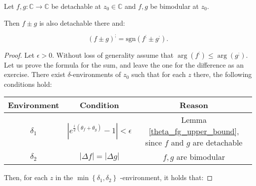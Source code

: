\documentclass[11pt]{book}
\begin{document}
\begin{theorem}Let $f,g:\mathbb{C}\longrightarrow\mathbb{C}$ be detachable at $z_{0}\in\mathbb{C}$ and $f,g$ be bimodular at $z_{0}.$

Then $f\pm g$ is also detachable there and:

$$\left(f\pm g\right)^{;}=\text{sgn}\left(f^{;}\pm g^{;}\right).$$
\label{complex_sum_rule}
\end{theorem}
\begin{proof}Let $\epsilon>0.$ Without loss of generality assume that $\arg\left(f^{;}\right)\leq\arg\left(g^{;}\right).$ Let us prove the formula for the sum, and leave the one for the difference as an exercise. There exist $\delta$-environments of $z_{0}$ such that for each $z$ there, the following conditions hold:

\begin{table}[H]
\centering
        \begin{tabular}{ccc}
        \toprule
        \textbf{Environment} & \textbf{Condition} & \textbf{Reason} \\
        \midrule
        $\delta_1$ & $\left|e^{\frac{i}{2}\left(\theta_{f}+\theta_{g}\right)}-1\right|<\epsilon$ & Lemma \ref{theta_fg_upper_bound}, since $f$ and $g$ are detachable \\
        $\delta_2$ & $\left|\Delta f\right|=\left|\Delta g\right|$ & $f,g$ are bimodular \\
        \bottomrule
        \end{tabular}
\end{table}

Then, for each $z$ in the $\min\left\{ \delta_{1},\delta_{2}\right\}$ -environment, it holds that:


\end{proof}
\end{document}
